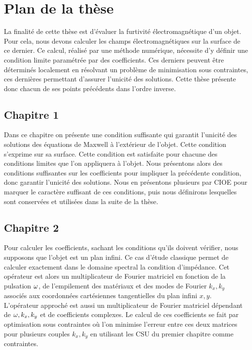 \section*{Plan de la thèse}

La finalité de cette thèse est d'évaluer la furtivité électromagnétique d'un objet. Pour cela, nous devons calculer les champs électromagnétiques sur la surface de ce dernier. Ce calcul, réalisé par une méthode numérique, nécessite d'y définir une condition limite paramétrée par des coefficients. Ces derniers peuvent être déterminés localement en résolvant un problème de minimisation sous contraintes, ces dernières permettant d'assurer l'unicité des solutions. Cette thèse présente donc chacun de ses points précédents dans l'ordre inverse.

\subsection*{Chapitre 1}
Dans ce chapitre on présente une condition suffisante qui garantit l'unicité des solutions des équations de Maxwell à l'extérieur de l'objet.
Cette condition s'exprime sur sa surface. Cette condition est satisfaite pour chacune des conditions limites que l'on appliquera à l'objet. Nous présentons alors des conditions suffisantes sur les coefficients pour impliquer la précédente condition, donc garantir l'unicité des solutions.
Nous en présentons plusieurs par CIOE pour marquer le caractère suffisant de ces conditions, puis nous définirons lesquelles sont conservées et utilisées dans la suite de la thèse.

\subsection*{Chapitre 2}
Pour calculer les coefficients, sachant les conditions qu'ils doivent vérifier, nous supposons que l'objet est un plan infini. Ce cas d'étude classique permet de calculer exactement dans le domaine spectral la condition d’impédance. 
Cet opérateur est alors un multiplicateur de Fourier matriciel en fonction de la pulsation \(\omega\), de l'empilement des matériaux et des modes de Fourier \(k_x, k_y\) associés aux coordonnées cartésiennes tangentielles du plan infini \(x,y\).
L'opérateur approché est aussi un multiplicateur de Fourier matriciel dépendant de \(\omega, k_x, k_y\) et de coefficients complexes.
Le calcul de ces coefficients se fait par optimisation sous contraintes où l'on minimise l'erreur entre ces deux matrices pour plusieurs couples \(k_x,k_y\) en utilisant les CSU du premier chapitre comme contraintes.

